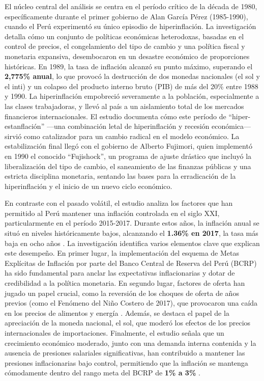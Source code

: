 \documentclass[
  stu,
  floatsintext,
  longtable,
  a4paper,
  nolmodern,
  notxfonts,
  notimes,
  12pt,
  colorlinks=true,linkcolor=blue,citecolor=blue,urlcolor=blue]{apa7}
\begin{document}
El núcleo central del análisis se centra en el período crítico de la
década de 1980, específicamente durante el primer gobierno de Alan
García Pérez (1985-1990), cuando el Perú experimentó su único episodio
de hiperinflación. La investigación detalla cómo un conjunto de
políticas económicas heterodoxas, basadas en el control de precios, el
congelamiento del tipo de cambio y una política fiscal y monetaria
expansiva, desembocaron en un desastre económico de proporciones
históricas. En 1989, la tasa de inflación alcanzó su punto máximo,
superando el \textbf{2,775\% anual}, lo que provocó la destrucción de
dos monedas nacionales (el sol y el inti) y un colapso del producto
interno bruto (PIB) de más del 20\% entre 1988 y 1990. La hiperinflación
empobreció severamente a la población, especialmente a las clases
trabajadoras, y llevó al país a un aislamiento total de los mercados
financieros internacionales. El estudio documenta cómo este período de
``hiper-estanflación'' ---una combinación letal de hiperinflación y
recesión económica--- sirvió como catalizador para un cambio radical en
el modelo económico. La estabilización final llegó con el gobierno de
Alberto Fujimori, quien implementó en 1990 el conocido ``Fujishock'', un
programa de ajuste drástico que incluyó la liberalización del tipo de
cambio, el saneamiento de las finanzas públicas y una estricta
disciplina monetaria, sentando las bases para la erradicación de la
hiperinflación y el inicio de un nuevo ciclo económico.

En contraste con el pasado volátil, el estudio analiza los factores que
han permitido al Perú mantener una inflación controlada en el siglo XXI,
particularmente en el período 2015-2017. Durante estos años, la
inflación anual se situó en niveles históricamente bajos, alcanzando el
\textbf{1.36\% en 2017}, la tasa más baja en ocho años . La
investigación identifica varios elementos clave que explican este
desempeño. En primer lugar, la implementación del esquema de Metas
Explícitas de Inflación por parte del Banco Central de Reserva del Perú
(BCRP) ha sido fundamental para anclar las expectativas inflacionarias y
dotar de credibilidad a la política monetaria. En segundo lugar,
factores de oferta han jugado un papel crucial, como la reversión de los
choques de oferta de años previos (como el Fenómeno del Niño Costero de
2017), que provocaron una caída en los precios de alimentos y energía .
Además, se destaca el papel de la apreciación de la moneda nacional, el
sol, que moderó los efectos de los precios internacionales de
importaciones. Finalmente, el estudio señala que un crecimiento
económico moderado, junto con una demanda interna contenida y la
ausencia de presiones salariales significativas, han contribuido a
mantener las presiones inflacionarias bajo control, permitiendo que la
inflación se mantenga cómodamente dentro del rango meta del BCRP de
\textbf{1\% a 3\%} .
\end{document}
